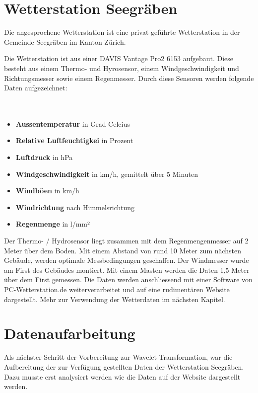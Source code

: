 \begin{refsection}
\section{Wetterstation Seegräben}

Die  angesprochene Wetterstation ist eine privat geführte Wetterstation in der Gemeinde Seegräben im Kanton Zürich.

Die Wetterstation ist aus einer DAVIS Vantage Pro2 6153 aufgebaut.
Diese besteht aus einem Thermo- und  Hyrosensor, einem Windgeschwindigkeit und Richtungsmesser sowie einem Regenmesser. 
Durch diese Sensoren werden folgende Daten aufgezeichnet:
\\
\\
\\


\begin{itemize}
	\item \textbf{Aussentemperatur} in Grad Celcius
	\item \textbf{Relative Luftfeuchtigkei} in Prozent
	\item \textbf{Luftdruck} in hPa
	\item \textbf{Windgeschwindigkeit} in km/h, gemittelt über 5 Minuten
	\item \textbf{Windböen} in km/h
	\item \textbf{Windrichtung} nach Himmelsrichtung
	\item \textbf{Regenmenge} in l/mm²
\end{itemize}	


Der Thermo- / Hydrosensor liegt zusammen mit dem Regenmengenmesser auf 2 Meter über dem Boden.
Mit einem Abstand von rund 10 Meter zum nächsten Gebäude, werden optimale Messbedingungen geschaffen.
Der Windmesser wurde am First des Gebäudes montiert.
Mit einem Masten werden die Daten 1,5 Meter über dem First gemessen\cite{online:wss}.
Die Daten werden anschliessend mit einer Software von PC-Wetterstation.de weiterverarbeitet und auf eine rudiment\"aren Website dargestellt.
Mehr zur Verwendung der Wetterdaten im n\"achsten Kapitel.

\section{Datenaufarbeitung}
Als n\"achster Schritt der Vorbereitung zur Wavelet Transformation, war die Aufbereitung der zur Verf\"ugung gestellten Daten der Wetterstation Seegr\"aben. Dazu musste erst analysiert werden wie die Daten auf der Website dargestellt werden.

\end{refsection}
